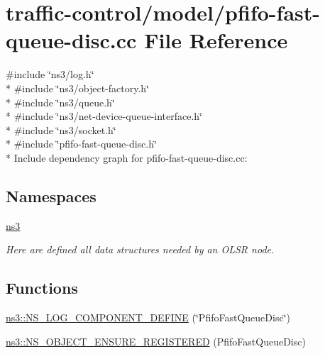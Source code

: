\hypertarget{pfifo-fast-queue-disc_8cc}{}\section{traffic-\/control/model/pfifo-\/fast-\/queue-\/disc.cc File Reference}
\label{pfifo-fast-queue-disc_8cc}
{\ttfamily \#include \char`\"{}ns3/log.\+h\char`\"{}}\\*
{\ttfamily \#include \char`\"{}ns3/object-\/factory.\+h\char`\"{}}\\*
{\ttfamily \#include \char`\"{}ns3/queue.\+h\char`\"{}}\\*
{\ttfamily \#include \char`\"{}ns3/net-\/device-\/queue-\/interface.\+h\char`\"{}}\\*
{\ttfamily \#include \char`\"{}ns3/socket.\+h\char`\"{}}\\*
{\ttfamily \#include \char`\"{}pfifo-\/fast-\/queue-\/disc.\+h\char`\"{}}\\*
Include dependency graph for pfifo-\/fast-\/queue-\/disc.cc\+:
\subsection*{Namespaces}
\begin{DoxyCompactItemize}
\item 
 \hyperlink{namespacens3}{ns3}
\begin{DoxyCompactList}\small\item\em Here are defined all data structures needed by an O\+L\+SR node. \end{DoxyCompactList}\end{DoxyCompactItemize}
\subsection*{Functions}
\begin{DoxyCompactItemize}
\item 
\hyperlink{namespacens3_a15d7755fe8185e9c4c3d931167fd9580}{ns3\+::\+N\+S\+\_\+\+L\+O\+G\+\_\+\+C\+O\+M\+P\+O\+N\+E\+N\+T\+\_\+\+D\+E\+F\+I\+NE} (\char`\"{}Pfifo\+Fast\+Queue\+Disc\char`\"{})
\item 
\hyperlink{namespacens3_a098fdd4d14bc00178bd0ec8437c77efa}{ns3\+::\+N\+S\+\_\+\+O\+B\+J\+E\+C\+T\+\_\+\+E\+N\+S\+U\+R\+E\+\_\+\+R\+E\+G\+I\+S\+T\+E\+R\+ED} (Pfifo\+Fast\+Queue\+Disc)
\end{DoxyCompactItemize}
